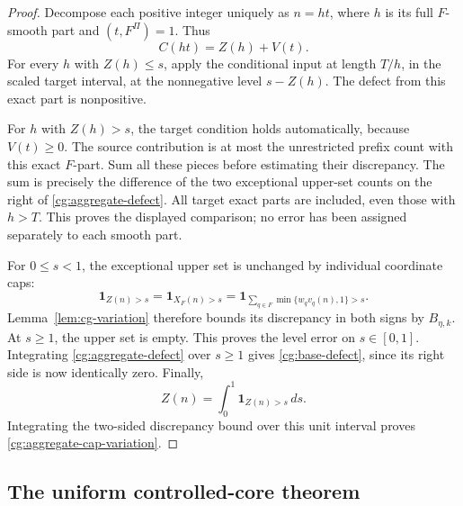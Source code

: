 \begin{proof}
Decompose each positive integer uniquely as \(n=ht\), where \(h\)
is its full \(F\)-smooth part and \((t,F^\Pi)=1\). Thus
\[
 C(ht)=Z(h)+V(t).
\]
For every \(h\) with \(Z(h)\le s\), apply the conditional input at
length \(T/h\), in the scaled target interval, at the nonnegative
level \(s-Z(h)\). The defect from this exact part is nonpositive.

For \(h\) with \(Z(h)>s\), the target condition holds automatically,
because \(V(t)\ge0\). The source contribution is at most the
unrestricted prefix count with this exact \(F\)-part. Sum all these
pieces before estimating their discrepancy. The sum is precisely
the difference of the two exceptional upper-set counts on the
right of \eqref{cg:aggregate-defect}. All target exact parts are
included, even those with \(h>T\). This proves the displayed
comparison; no error has been assigned separately to each smooth
part.

For \(0\le s<1\), the exceptional upper set is unchanged by
individual coordinate caps:
\[
 \mathbf1_{Z(n)>s}
 =\mathbf1_{X_F(n)>s}
 =\mathbf1_{\sum_{q\in F}\min\{w_qv_q(n),1\}>s}.
\]
Lemma~\ref{lem:cg-variation} therefore bounds its discrepancy in
both signs by \(B_{\eta,k}\). At \(s\ge1\), the upper set is
empty. This proves the level error on \(s\in[0,1]\).
Integrating \eqref{cg:aggregate-defect} over \(s\ge1\) gives
\eqref{cg:base-defect}, since its right side is now identically
zero. Finally,
\[
 Z(n)=\int_0^1\mathbf1_{Z(n)>s}\,ds.
\]
Integrating the two-sided discrepancy bound over this unit interval
proves \eqref{cg:aggregate-cap-variation}.
\end{proof}

\subsection{The uniform controlled-core theorem}

